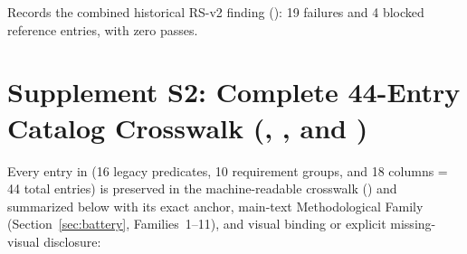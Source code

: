 Records the combined historical RS-v2 finding (): 19 failures and 4 blocked reference entries, with zero passes.

\section*{Supplement S2: Complete 44-Entry Catalog Crosswalk (, , and )}
\label{sup:crosswalk-44}

Every entry in  (16  legacy predicates, 10  requirement groups, and 18  columns = 44 total entries) is preserved in the machine-readable crosswalk () and summarized below with its exact  anchor, main-text Methodological Family (Section~\ref{sec:battery}, Families~1--11), and visual binding or explicit missing-visual disclosure:
